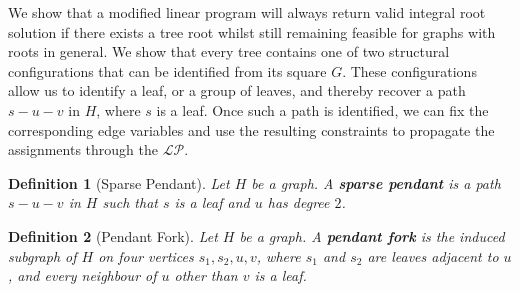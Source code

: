 \documentclass[11pt]{article}
\newtheorem{definition}{Definition}[section]
\begin{document}
We show that a modified linear program will always return valid integral root solution if there exists a tree root whilst still remaining feasible for graphs with roots in general. We show that every tree contains one of two structural configurations that can be identified from its square $G$. These configurations allow us to identify a leaf, or a group of leaves, and thereby recover a path $s-u-v$ in $H$, where $s$ is a leaf. Once such a path is identified, we can fix the corresponding edge variables and use the resulting constraints to propagate the assignments through the $\mathcal{LP}$.

\begin{definition}[Sparse Pendant] \label{def::sparse_pendant}
  Let $H$ be a graph. A \textbf{sparse pendant} is a path $s-u-v$ in $H$ such that $s$ is a leaf and $u$ has degree $2$.
\end{definition}
\begin{definition}[Pendant Fork] \label{def::pendant_fork}
  Let $H$ be a graph. A \textbf{pendant fork} is the induced subgraph of $H$ on four vertices $s_1,s_2,u,v$, where $s_1$ and $s_2$ are leaves adjacent to $u$, and every neighbour of $u$ other than $v$ is a leaf.
\end{definition}
\end{document}
